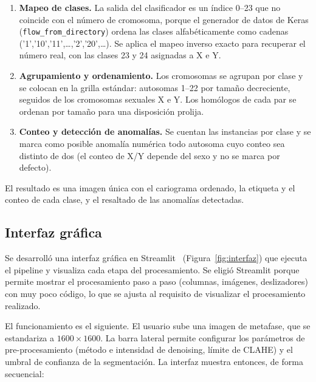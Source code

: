 \documentclass[11pt,a4paper]{article}
\begin{document}
\begin{enumerate}[topsep=2pt,itemsep=1pt]
  \item \textbf{Mapeo de clases.} La salida del clasificador es un índice 0--23 que
        no coincide con el número de cromosoma, porque el generador de datos de Keras
        (\texttt{flow\_from\_directory}) ordena las clases alfabéticamente como
        cadenas ('1','10','11',\ldots,'2','20',\ldots). Se aplica el mapeo inverso
        exacto para recuperar el número real, con las clases 23 y 24 asignadas a X e
        Y.
  \item \textbf{Agrupamiento y ordenamiento.} Los cromosomas se agrupan por clase y
        se colocan en la grilla estándar: autosomas 1--22 por tamaño decreciente,
        seguidos de los cromosomas sexuales X e Y. Los homólogos de cada par se
        ordenan por tamaño para una disposición prolija.
  \item \textbf{Conteo y detección de anomalías.} Se cuentan las instancias por
        clase y se marca como posible anomalía numérica todo autosoma cuyo conteo sea
        distinto de dos (el conteo de X/Y depende del sexo y no se marca por
        defecto).
\end{enumerate}

El resultado es una imagen única con el cariograma ordenado, la etiqueta y el conteo
de cada clase, y el resaltado de las anomalías detectadas.

\subsection{Interfaz gráfica}
\label{sec:interfaz}

Se desarrolló una interfaz gráfica en Streamlit~\cite{streamlit}
(Figura~\ref{fig:interfaz}) que ejecuta el pipeline y visualiza cada etapa
del procesamiento. Se eligió Streamlit
porque permite mostrar el procesamiento paso a paso (columnas, imágenes,
deslizadores) con muy poco código, lo que se ajusta al requisito de visualizar
el procesamiento realizado.

El funcionamiento es el siguiente. El usuario sube una imagen de metafase, que se
estandariza a \(1600\times1600\). La barra lateral permite configurar los
parámetros de pre-procesamiento (método e intensidad de denoising, límite de CLAHE)
y el umbral de confianza de la segmentación. La interfaz muestra entonces, de forma
secuencial:
\end{document}
